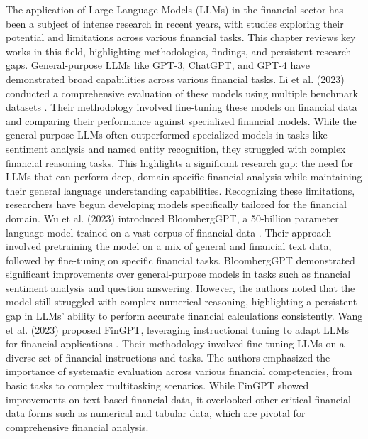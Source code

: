 \documentclass[logo,msc]{infthesis}           %
\begin{document}
The application of Large Language Models (LLMs) in the financial sector has been a subject of intense research in recent years, with studies exploring their potential and limitations across various financial tasks. This chapter reviews key works in this field, highlighting methodologies, findings, and persistent research gaps.
General-purpose LLMs like GPT-3, ChatGPT, and GPT-4 have demonstrated broad capabilities across various financial tasks. Li et al. (2023) conducted a comprehensive evaluation of these models using multiple benchmark datasets \cite{li2023large}. Their methodology involved fine-tuning these models on financial data and comparing their performance against specialized financial models. While the general-purpose LLMs often outperformed specialized models in tasks like sentiment analysis and named entity recognition, they struggled with complex financial reasoning tasks. This highlights a significant research gap: the need for LLMs that can perform deep, domain-specific financial analysis while maintaining their general language understanding capabilities.
Recognizing these limitations, researchers have begun developing models specifically tailored for the financial domain. Wu et al. (2023) introduced BloombergGPT, a 50-billion parameter language model trained on a vast corpus of financial data \cite{wu2023bloomberggptlargelanguagemodel}. Their approach involved pretraining the model on a mix of general and financial text data, followed by fine-tuning on specific financial tasks. BloombergGPT demonstrated significant improvements over general-purpose models in tasks such as financial sentiment analysis and question answering. However, the authors noted that the model still struggled with complex numerical reasoning, highlighting a persistent gap in LLMs' ability to perform accurate financial calculations consistently.
Wang et al. (2023) proposed FinGPT, leveraging instructional tuning to adapt LLMs for financial applications \cite{wang2023fingptinstructiontuningbenchmark}. Their methodology involved fine-tuning LLMs on a diverse set of financial instructions and tasks. The authors emphasized the importance of systematic evaluation across various financial competencies, from basic tasks to complex multitasking scenarios. While FinGPT showed improvements on text-based financial data, it overlooked other critical financial data forms such as numerical and tabular data, which are pivotal for comprehensive financial analysis.
\end{document}
